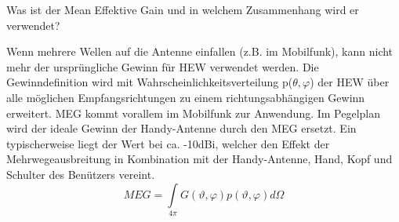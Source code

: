 \begin{question}[section=13,name={Mean Effektive Gain},difficulty=,quantity=,type=thr,tags={20131024,20130724}]
	Was ist der Mean Effektive Gain und in welchem Zusammenhang wird er verwendet?
	
	
\end{question}
\begin{solution}
	Wenn mehrere Wellen auf die Antenne einfallen (z.B. im Mobilfunk), kann nicht mehr der ursprüngliche Gewinn für HEW verwendet werden. Die Gewinndefinition wird mit Wahrscheinlichkeitsverteilung p($\theta,\varphi$) der HEW über alle möglichen Empfangsrichtungen zu einem richtungsabhängigen Gewinn erweitert. MEG kommt vorallem im Mobilfunk zur Anwendung. Im Pegelplan wird der ideale Gewinn der Handy-Antenne durch den MEG ersetzt. Ein typischerweise liegt der Wert bei ca. -10dBi, welcher den Effekt der Mehrwegeausbreitung in Kombination mit der Handy-Antenne, Hand, Kopf und Schulter des Benützers vereint.
	\begin{equation}
		MEG= \int \limits_{4\pi} G(\vartheta,\varphi) p(\vartheta,\varphi) d\Omega
	\end{equation}
\end{solution}